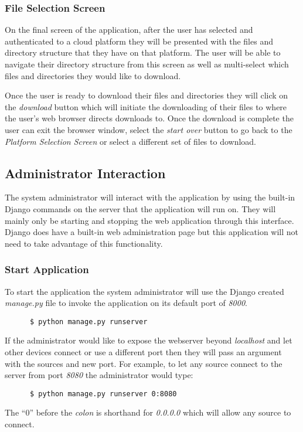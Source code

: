 \documentclass{article}
\begin{document}
      \subsubsection{File Selection Screen}
      On the final screen of the application, after the user has selected and authenticated to a cloud platform they will be
      presented with the files and directory structure that they have on that platform. The user will be able to navigate their
      directory structure from this screen as well as multi-select which files and directories they would like to download.

      Once the user is ready to download their files and directories they will click on the \textit{download} button which will
      initiate the downloading of their files to where the user's web browser directs downloads to. Once the download is complete
      the user can exit the browser window, select the \textit{start over} button to go back to the \textit{Platform Selection Screen}
      or select a different set of files to download.
    
    \subsection{Administrator Interaction}
    The system administrator will interact with the application by using the built-in Django commands on the
    server that the application will run on. They will mainly only be starting and stopping the web application
    through this interface. Django does have a built-in web administration page but this application will not
    need to take advantage of this functionality.

      \subsubsection{Start Application}
      To start the application the system administrator will use the Django created \textit{manage.py} file
      to invoke the application on its default port of \textit{8000}.
      \begin{verbatim}
      $ python manage.py runserver
      \end{verbatim}

      If the administrator would like to expose the webserver beyond \textit{localhost} and let other devices connect or
      use a different port then they will pass an argument with the sources and new port. For example, to let any source
      connect to the server from port \textit{8080} the administrator would type:
      \begin{verbatim}
      $ python manage.py runserver 0:8080
      \end{verbatim}
      The ``0'' before the \textit{colon} is shorthand for \textit{0.0.0.0} which will allow any source to connect.
\end{document}
